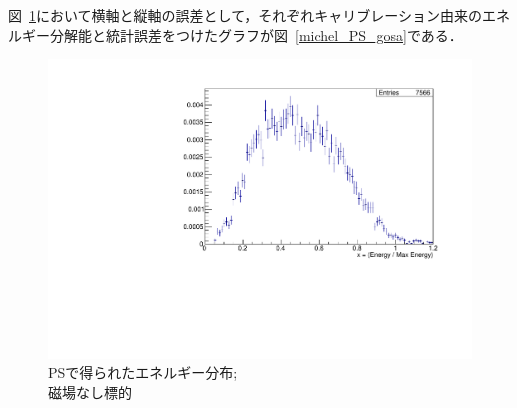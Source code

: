   図~\ref{michel_PS}において横軸と縦軸の誤差として，それぞれキャリブレーション由来のエネルギー分解能と統計誤差をつけたグラフが図~\ref{michel_PS_gosa}である．
  \begin{figure}[H]
   \centering
   \begin{minipage}{0.4\columnwidth}
    \centering
    \includegraphics[height=\columnwidth,angle=-90]{figure/ikemitsu/michel_PS.pdf}
    \caption{PSで得られたエネルギー分布;\\磁場なし標的}
    \label{michel_PS}    
   \end{minipage} 
   \begin{minipage}{0.4\columnwidth}
    \centering

\end{minipage}
\end{figure}
